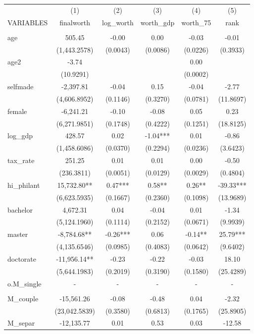 \documentclass[]{article}
\begin{document}
\begin{tabular}{lccccc} \hline
 & (1) & (2) & (3) & (4) & (5) \\
VARIABLES & finalworth & log\_worth & worth\_gdp & worth\_75 & rank \\ \hline
 &  &  &  &  &  \\
age & 505.45 & -0.00 & 0.00 & -0.03 & -0.01 \\
 & (1,443.2578) & (0.0043) & (0.0086) & (0.0226) & (0.3933) \\
age2 & -3.74 &  &  & 0.00 &  \\
 & (10.9291) &  &  & (0.0002) &  \\
selfmade & -2,397.81 & -0.04 & 0.15 & -0.04 & -2.77 \\
 & (4,606.8952) & (0.1146) & (0.3270) & (0.0781) & (11.8697) \\
female & -6,241.21 & -0.10 & -0.08 & 0.05 & 0.23 \\
 & (6,271.9851) & (0.1748) & (0.4222) & (0.1251) & (18.8125) \\
log\_gdp & 428.57 & 0.02 & -1.04*** & 0.01 & -0.86 \\
 & (1,458.6086) & (0.0370) & (0.2294) & (0.0236) & (3.6423) \\
tax\_rate & 251.25 & 0.01 & 0.01 & 0.00 & -0.50 \\
 & (236.3811) & (0.0051) & (0.0129) & (0.0029) & (0.4804) \\
hi\_philant & 15,732.80** & 0.47*** & 0.58** & 0.26** & -39.33*** \\
 & (6,623.5935) & (0.1667) & (0.2360) & (0.1098) & (13.9689) \\
bachelor & 4,672.31 & 0.04 & -0.04 & 0.01 & -1.34 \\
 & (5,124.1960) & (0.1114) & (0.2152) & (0.0671) & (9.9939) \\
master & -8,784.68** & -0.26*** & 0.06 & -0.14** & 25.79*** \\
 & (4,135.6546) & (0.0985) & (0.4083) & (0.0642) & (9.6402) \\
doctorate & -11,956.14** & -0.23 & -0.22 & -0.03 & 18.10 \\
 & (5,644.1983) & (0.2019) & (0.3190) & (0.1580) & (25.4289) \\
o.M\_single & - & - & - & - & - \\
 &  &  &  &  &  \\
M\_couple & -15,561.26 & -0.08 & -0.48 & 0.04 & -2.32 \\
 & (23,042.5839) & (0.3580) & (0.6813) & (0.1765) & (25.8905) \\
M\_separ & -12,135.77 & 0.01 & 0.53 & 0.03 & -12.58 \\

\end{tabular}
\end{document}
